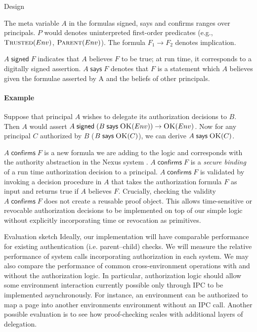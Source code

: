 \documentclass[10pt]{article}
\newcommand{\sign}[2]{\ensuremath{#1\;\textsf{signed}\;#2}}
\newcommand{\imp}[2]{\ensuremath{#1 \rightarrow #2}}
\newcommand{\says}[2]{\ensuremath{#1\;\textsf{says}\;#2}}
\newcommand{\confirms}[2]{\ensuremath{#1\;\textsf{confirms}\;#2}}
\newcommand{\pred}[2]{\ensuremath{\textsc{#1}(#2)}}
\begin{document}
\begin{section}{Design}
\medskip

The meta variable $A$ in the formulas \textsf{signed}, \textsf{says} and \textsf{confirms} ranges over principals.
$P$ would denotes uninterpreted first-order predicates (e.g., \pred{Trusted}{Env}, \pred{Parent}{Env}).
The formula \imp{F_1}{F_2} denotes implication. 

\sign{A}{F} indicates that $A$ believes $F$ to be true; at run time, it corresponds to a digitally signed assertion.
\says{A}{F} denotes that $F$ is a statement which $A$ believes given the formulae asserted by A and the beliefs of other principals.

\paragraph{Example} Suppose that principal $A$ wishes to delegate its authorization decisions to $B$. Then $A$ would assert \sign{A}{\imp{(\says{B}{\pred{OK}{Env}})}{\pred{OK}{Env}}}. Now for any principal $C$ authorized by $B$ (\says{B}{\pred{OK}{C}}), we can derive \says{A}{\pred{OK}{C}}.

\medskip

\confirms{A}{F} is a new formula we are adding to the logic and corresponds with the authority abstraction in the Nexus system \cite{Nexus}. 
\confirms{A}{F} is a \emph{secure binding} of a run time authorization decision to a principal. \confirms{A}{F} is validated by invoking a decision procedure in $A$ that takes the authorization formula $F$ as input and returns true if $A$ believes $F$.
Crucially, checking the validity $\confirms{A}{F}$ does not create a reusable proof object.
This allows time-sensitive or revocable authorization decisions to be implemented on top of our simple logic without explicitly incorporating time or revocation as primitives.
\end{section}

\begin{section}{Evaluation sketch}
Ideally, our implementation will have comparable performance for existing authentication (i.e. parent--child) checks.
We will measure the relative performance of system calls incorporating authorization in each system.
We may also compare the performance of common cross-environment operations with and without the authorization logic.
In particular, authorization logic should allow some environment interaction currently possible only through IPC to be implemented asynchronously.
For instance, an environment can be authorized to map a page into another environments environment without an IPC call.
Another possible evaluation is to see how proof-checking scales with additional layers of delegation.
\end{section}
\end{document}
